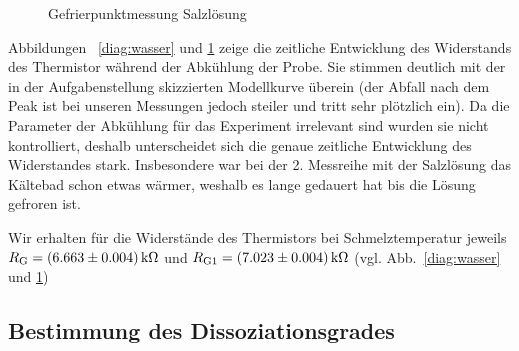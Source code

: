 \begin{figure}    
    
    \caption{Gefrierpunktmessung Salzlösung}
    \label{diag:salz}
\end{figure}

Abbildungen ~\ref{diag:wasser} und \ref{diag:salz} zeige die zeitliche Entwicklung des Widerstands des Thermistor während der Abkühlung der Probe. Sie stimmen deutlich mit der in der Aufgabenstellung skizzierten Modellkurve überein (der Abfall nach dem Peak ist bei unseren Messungen jedoch steiler und tritt sehr plötzlich ein). 
Da die Parameter der Abkühlung für das Experiment irrelevant sind wurden sie nicht kontrolliert, deshalb unterscheidet sich die genaue zeitliche Entwicklung des Widerstandes stark. Insbesondere war bei der 2. Messreihe mit der Salzlösung das Kältebad schon etwas wärmer, weshalb es lange gedauert hat bis die Lösung gefroren ist.

Wir erhalten für die Widerstände des Thermistors bei Schmelztemperatur jeweils $R_\mathrm{G} = \unit[(6.663 \pm 0.004)]{k\Omega}$ und $R_\mathrm{G1} = \unit[(7.023 \pm 0.004)]{k\Omega}$ (vgl. Abb.~\ref{diag:wasser} und \ref{diag:salz})

\subsection{Bestimmung des Dissoziationsgrades}

